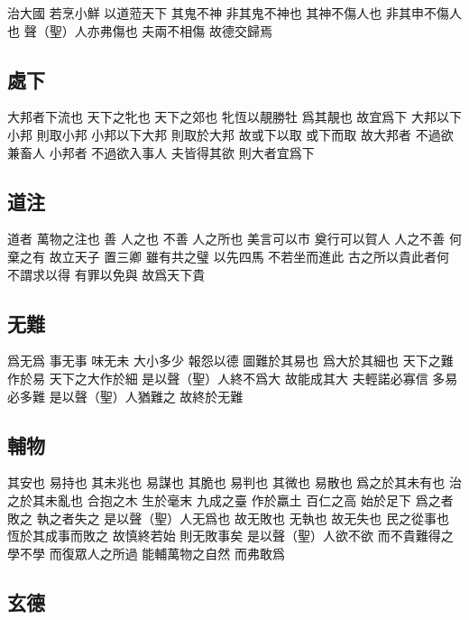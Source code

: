 \documentclass[a5paper,zihao=-4,oneside,UTF8]{ctexart}
\begin{document}
治大國 若烹小鮮 
以道蒞天下 其鬼不神 非其鬼不神也 其神不傷人也 非其申不傷人也 聲（聖）人亦弗傷也 
夫兩不相傷 故德交歸焉 



\subsection{處下}



大邦者下流也 天下之牝也 天下之郊也 
牝恆以靚勝牡 爲其靚也 故宜爲下 
大邦以下小邦 則取小邦 小邦以下大邦 則取於大邦 故或下以取 或下而取 
故大邦者 不過欲兼畜人 小邦者 不過欲入事人 
夫皆得其欲 則大者宜爲下 



\subsection{道注}



道者 萬物之注也 善 人之也 不善 人之所也 美言可以市 奠行可以賀人 
人之不善 何棄之有 
故立天子 置三卿 雖有共之璧 以先四馬 不若坐而進此 
古之所以貴此者何 不謂求以得 有罪以免與 故爲天下貴 



\subsection{无難}



爲无爲 事无事 味无未 
大小多少 報怨以德 
圖難於其易也 爲大於其細也 天下之難作於易 天下之大作於細 
是以聲（聖）人終不爲大 故能成其大 
夫輕諾必寡信 多易必多難 
是以聲（聖）人猶難之 故終於无難 



\subsection{輔物}



其安也 易持也 其未兆也 易謀也 其脆也 易判也 其微也 易散也 爲之於其未有也 治之於其未亂也 合抱之木 生於毫末 九成之臺 作於羸土 百仁之高 始於足下 
爲之者敗之 執之者失之 是以聲（聖）人无爲也 故无敗也 无執也 故无失也 民之從事也 恆於其成事而敗之 故慎終若始 則无敗事矣 是以聲（聖）人欲不欲 而不貴難得之 學不學 而復眾人之所過 能輔萬物之自然 而弗敢爲 



\subsection{玄德}
\end{document}

